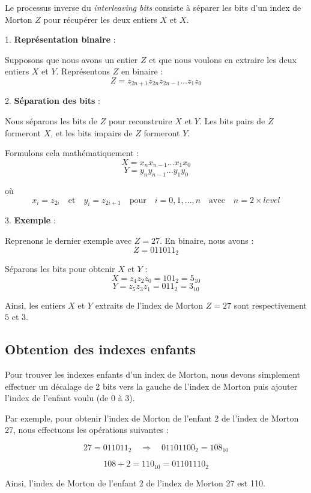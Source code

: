 Le processus inverse du \textit{interleaving bits} consiste à séparer les bits d'un index de Morton \( Z \) pour récupérer les deux entiers \( X \) et \( X \).

1. \textbf{Représentation binaire} :

   Supposons que nous avons un entier \( Z \) et que nous voulons en extraire les deux entiers \( X \) et \( Y \). Représentons \( Z \) en binaire :
   \[
   Z = z_{2n+1} z_{2n} z_{2n-1} \ldots z_1 z_0
   \]

2. \textbf{Séparation des bits} :

   Nous séparons les bits de \( Z \) pour reconstruire \( X \) et \( Y \). Les bits pairs de \( Z \) formeront \( X \), et les bits impairs de \( Z \) formeront \( Y \).

   Formulons cela mathématiquement :
   \[
   X = x_n x_{n-1} \ldots x_1 x_0
   \]
   \[
   Y = y_n y_{n-1} \ldots y_1 y_0
   \]

   où
   \[
   x_i = z_{2i} \quad \text{et} \quad y_i = z_{2i+1} \quad \text{pour} \quad i = 0, 1, \ldots, n \quad \text{avec} \quad n = 2 \times {level}
   \]

3. \textbf{Exemple} :

   Reprenons le dernier exemple avec \( Z = 27 \). En binaire, nous avons :
   \[
   Z = 011011_2
   \]

   Séparons les bits pour obtenir \( X \) et \( Y \) :
   \[
   X = z_{4}z_{2}z_{0} = 101_2 = 5_{10}
   \]
   \[
   Y = z_{5}z_{3}z_{1} = 011_2 = 3_{10}
   \]

Ainsi, les entiers \( X \) et \( Y \) extraits de l'index de Morton \( Z = 27 \) sont respectivement \( 5 \) et \( 3 \).

\subsection*{Obtention des indexes enfants}

Pour trouver les indexes enfants d'un index de Morton, nous devons simplement effectuer un décalage de 2 bits vers la gauche de l'index de Morton puis ajouter l'index de l'enfant voulu (de 0 à 3).

Par exemple, pour obtenir l'index de Morton de l'enfant 2 de l'index de Morton 27, nous effectuons les opérations suivantes :

\[
27 = 011011_2 \quad \Rightarrow \quad 01101100_2 = 108_{10}
\]

\[
108 + 2 = 110_{10} = 01101110_2
\]

Ainsi, l'index de Morton de l'enfant 2 de l'index de Morton 27 est 110.

